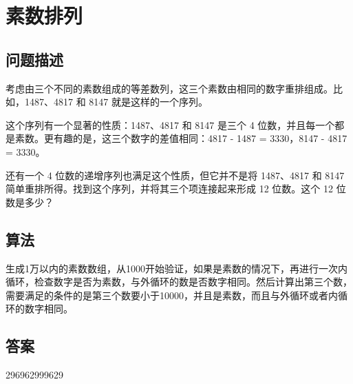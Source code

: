 \section{素数排列}\label{sec:problem49}
\subsection{问题描述}
\begin{tcolorbox}
考虑由三个不同的素数组成的等差数列，这三个素数由相同的数字重排组成。比如，1487、4817 和 8147 就是这样的一个序列。

这个序列有一个显著的性质：1487、4817 和 8147 是三个 4 位数，并且每一个都是素数。更有趣的是，这三个数字的差值相同：4817 - 1487 = 3330，8147 - 4817 = 3330。

还有一个 4 位数的递增序列也满足这个性质，但它并不是将 1487、4817 和 8147 简单重排所得。找到这个序列，并将其三个项连接起来形成 12 位数。这个 12 位数是多少？
\end{tcolorbox}

\subsection{算法}
生成1万以内的素数数组，从1000开始验证，如果是素数的情况下，再进行一次内循环，检查数字是否为素数，与外循环的数是否数字相同。然后计算出第三个数，需要满足的条件的是第三个数要小于10000，并且是素数，而且与外循环或者内循环的数字相同。

\subsection{答案}
296962999629
